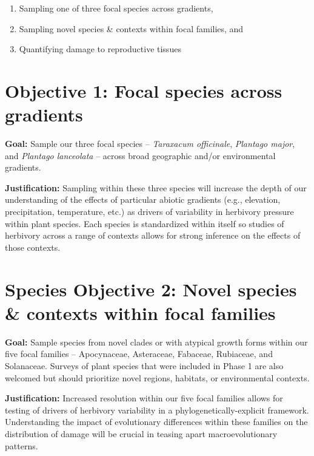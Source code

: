 \documentclass[
  letterpaper,
  DIV=11,
  numbers=noendperiod]{scrreprt}
\providecommand{\tightlist}{%
  \setlength{\itemsep}{0pt}\setlength{\parskip}{0pt}}\usepackage{longtable,booktabs,array}
\begin{document}
\begin{enumerate}
\def\labelenumi{(\arabic{enumi})}
\tightlist
\item
  Sampling one of three focal species across gradients,\\
\item
  Sampling novel species \& contexts within focal families, and
\item
  Quantifying damage to reproductive tissues
\end{enumerate}

\section{Objective 1: Focal species across
gradients}\label{objective-1-focal-species-across-gradients}

\textbf{Goal: }Sample our three focal species -- \emph{Taraxacum
officinale}, \emph{Plantago major}, and \emph{Plantago lanceolata} --
across broad geographic and/or environmental gradients.

\textbf{Justification:} Sampling within these three species will
increase the depth of our understanding of the effects of particular
abiotic gradients (e.g., elevation, precipitation, temperature, etc.) as
drivers of variability in herbivory pressure within plant species. Each
species is standardized within itself so studies of herbivory across a
range of contexts allows for strong inference on the effects of those
contexts.

\section{Species Objective 2: Novel species \& contexts within focal
families}\label{species-objective-2-novel-species-contexts-within-focal-families}

\textbf{Goal: }Sample species from novel clades or with atypical growth
forms within our five focal families -- Apocynaceae, Asteraceae,
Fabaceae, Rubiaceae, and Solanaceae. Surveys of plant species that were
included in Phase 1 are also welcomed but should prioritize novel
regions, habitats, or environmental contexts.

\textbf{Justification:} Increased resolution within our five focal
families allows for testing of drivers of herbivory variability in a
phylogenetically-explicit framework. Understanding the impact of
evolutionary differences within these families on the distribution of
damage will be crucial in teasing apart macroevolutionary patterns.
\end{document}
